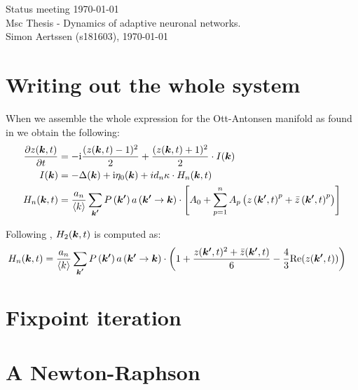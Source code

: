 


\mainmatter

Status meeting \today \\
Msc Thesis - Dynamics of adaptive neuronal networks. \\
Simon Aertssen (s181603), \today \\ 

\section{Writing out the whole system}
When we assemble the whole expression for the Ott-Antonsen manifold as found in \cite{OttAntonsen2017} we obtain the following:
\begin{align}
\frac{\partial z({\boldsymbol{k}}, t)}{\partial t} &= -\mathrm{i} \frac{(z({\boldsymbol{k}}, t)-1)^{2}}{2} + \frac{(z({\boldsymbol{k}}, t)+1)^{2}}{2} \cdot I({\boldsymbol{k}}) \\
I({\boldsymbol{k}}) &= -\Delta({\boldsymbol{k}}) + \mathrm{i} \eta_{0}({\boldsymbol{k}}) + i d_{n} \kappa \cdot H_n({\boldsymbol{k}},t) \\
H_n({\boldsymbol{k}},t) &= \frac{a_n}{{\langle k\rangle}} \sum_{{\boldsymbol{k'}}} P\left({\boldsymbol{k'}}\right) a\left({\boldsymbol{k'}} \rightarrow {\boldsymbol{k}}\right) \cdot \left[A_{0}+\sum_{p=1}^{n} A_{p}\left(z\left({\boldsymbol{k'}}, t\right)^{p} + \bar{z}\left({\boldsymbol{k'}}, t\right)^{p}\right)\right]
\end{align}

Following \cite{Martens2020}, $H_2({\boldsymbol{k}},t)$ is computed as:
\begin{align}
H_n({\boldsymbol{k}},t) &= \frac{a_n}{{\langle k\rangle}} \sum_{{\boldsymbol{k'}}} P\left({\boldsymbol{k'}}\right) a\left({\boldsymbol{k'}} \rightarrow {\boldsymbol{k}}\right) \cdot \left( 1 + \frac{z({\boldsymbol{k'}}, t)^2 + \bar{z}({\boldsymbol{k'}}, t)}{6} - \frac{4}{3} {\operatorname{Re}}(z({\boldsymbol{k'}}, t)) \right)
\end{align}


\section{Fixpoint iteration}

\section{A Newton-Raphson}


\small{}

\label{LastPage}~


